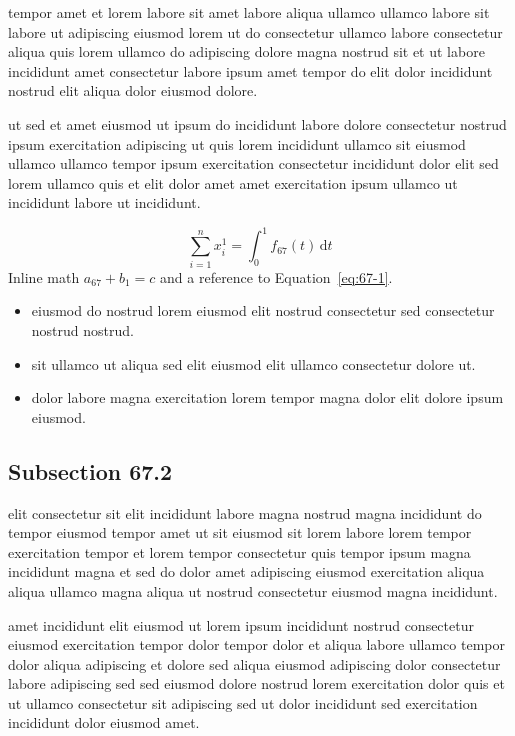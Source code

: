 \documentclass{article}
\begin{document}
tempor amet et lorem labore sit amet labore aliqua ullamco ullamco labore sit labore ut adipiscing eiusmod lorem ut do consectetur ullamco labore consectetur aliqua quis lorem ullamco do adipiscing dolore magna nostrud sit et ut labore incididunt amet consectetur labore ipsum amet tempor do elit dolor incididunt nostrud elit aliqua dolor eiusmod dolore.

ut sed et amet eiusmod ut ipsum do incididunt labore dolore consectetur nostrud ipsum exercitation adipiscing ut quis lorem incididunt ullamco sit eiusmod ullamco ullamco tempor ipsum exercitation consectetur incididunt dolor elit sed lorem ullamco quis et elit dolor amet amet exercitation ipsum ullamco ut incididunt labore ut incididunt.

\begin{equation}\label{eq:67-1}
  \sum_{i=1}^{n} x_i^{1} = \int_0^1 f_{67}(t)\,\mathrm{d}t
\end{equation}
Inline math $a_{67} + b_{1} = c$ and a reference to Equation~\eqref{eq:67-1}.

\begin{itemize}
  \item eiusmod do nostrud lorem eiusmod elit nostrud consectetur sed consectetur nostrud nostrud.
  \item sit ullamco ut aliqua sed elit eiusmod elit ullamco consectetur dolore ut.
  \item dolor labore magna exercitation lorem tempor magna dolor elit dolore ipsum eiusmod.
\end{itemize}

\subsection{Subsection 67.2}\label{sec:67-2}
elit consectetur sit elit incididunt labore magna nostrud magna incididunt do tempor eiusmod tempor amet ut sit eiusmod sit lorem labore lorem tempor exercitation tempor et lorem tempor consectetur quis tempor ipsum magna incididunt magna et sed do dolor amet adipiscing eiusmod exercitation aliqua aliqua ullamco magna aliqua ut nostrud consectetur eiusmod magna incididunt.

amet incididunt elit eiusmod ut lorem ipsum incididunt nostrud consectetur eiusmod exercitation tempor dolor tempor dolor et aliqua labore ullamco tempor dolor aliqua adipiscing et dolore sed aliqua eiusmod adipiscing dolor consectetur labore adipiscing sed sed eiusmod dolore nostrud lorem exercitation dolor quis et ut ullamco consectetur sit adipiscing sed ut dolor incididunt sed exercitation incididunt dolor eiusmod amet.
\end{document}
